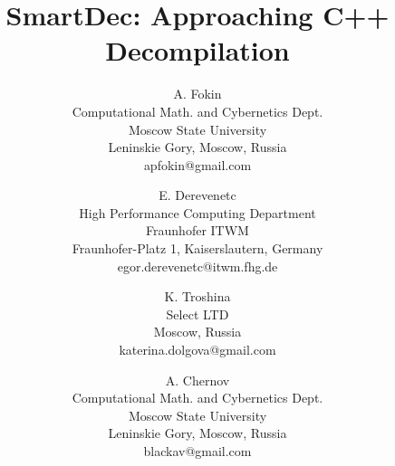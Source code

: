 \documentclass[10pt, conference, compsocconf]{IEEEtran}
\begin{document}
\title{SmartDec: Approaching C++ Decompilation}

\author{
}

\author{
A. Fokin\\
Computational Math. and Cybernetics Dept.\\
Moscow State University\\
Leninskie Gory, Moscow, Russia\\
apfokin@gmail.com
\and
E. Derevenetc\\
High Performance Computing Department\\
Fraunhofer ITWM\\
Fraunhofer-Platz 1, Kaiserslautern, Germany\\
egor.derevenetc@itwm.fhg.de\\
\and
K. Troshina\\
Select LTD\\
Moscow, Russia\\
katerina.dolgova@gmail.com
\and
A. Chernov\\
Computational Math. and Cybernetics Dept.\\
Moscow State University\\
Leninskie Gory, Moscow, Russia\\
blackav@gmail.com
}
\fi

\maketitle
\end{document}
